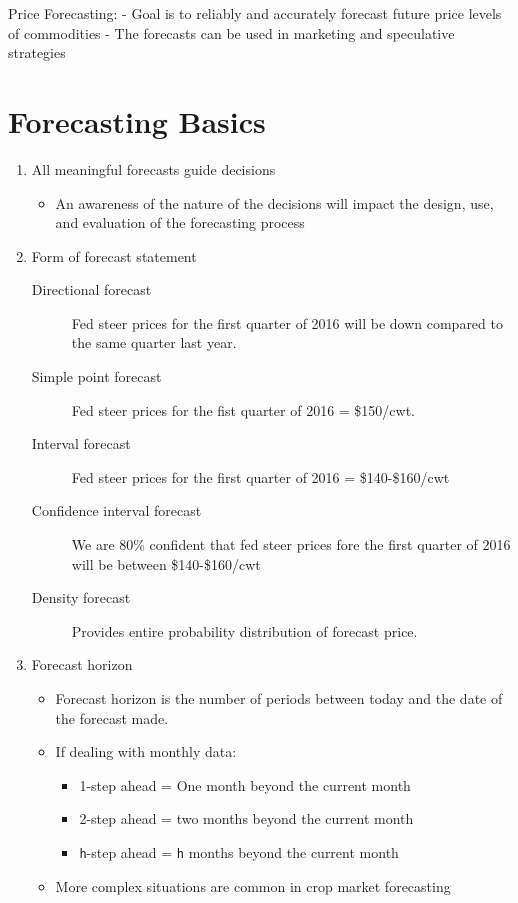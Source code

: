 \documentclass[
  letterpaper,
  DIV=11,
  numbers=noendperiod]{scrreprt}
\providecommand{\tightlist}{%
  \setlength{\itemsep}{0pt}\setlength{\parskip}{0pt}}\usepackage{longtable,booktabs,array}
\begin{document}
Price Forecasting: - Goal is to reliably and accurately forecast future
price levels of commodities - The forecasts can be used in marketing and
speculative strategies

\hypertarget{forecasting-basics}{%
\section{Forecasting Basics}\label{forecasting-basics}}

\begin{enumerate}
\def\labelenumi{\arabic{enumi}.}
\item
  All meaningful forecasts guide decisions

  \begin{itemize}
  \tightlist
  \item
    An awareness of the nature of the decisions will impact the design,
    use, and evaluation of the forecasting process
  \end{itemize}
\item
  Form of forecast statement

  \begin{description}
  \item[Directional forecast]
  Fed steer prices for the first quarter of 2016 will be down compared
  to the same quarter last year.
  \item[Simple point forecast]
  Fed steer prices for the fist quarter of 2016 = \$150/cwt.
  \item[Interval forecast]
  Fed steer prices for the first quarter of 2016 = \$140-\$160/cwt
  \item[Confidence interval forecast]
  We are 80\% confident that fed steer prices fore the first quarter of
  2016 will be between \$140-\$160/cwt
  \item[Density forecast]
  Provides entire probability distribution of forecast price.
  \end{description}
\item
  Forecast horizon

  \begin{itemize}
  \item
    Forecast horizon is the number of periods between today and the date
    of the forecast made.
  \item
    If dealing with monthly data:

    \begin{itemize}
    \tightlist
    \item
      1-step ahead = One month beyond the current month
    \item
      2-step ahead = two months beyond the current month
    \item
      \texttt{h}-step ahead = \texttt{h} months beyond the current month
    \end{itemize}
  \item
    More complex situations are common in crop market forecasting


\end{itemize}
\end{enumerate}
\end{document}
